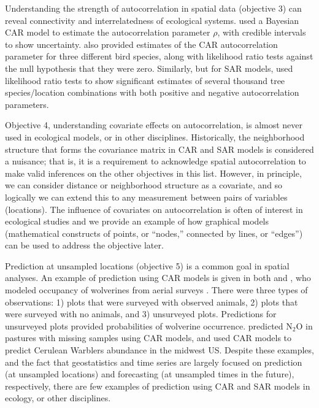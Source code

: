 Understanding the strength of autocorrelation in spatial data (objective 3) can reveal connectivity and interrelatedness of ecological systems.  \citet{Gard:Lawl:Ver:Mago:Kell:coar:2010} used a Bayesian CAR model to estimate the autocorrelation parameter $\rho$, with credible intervals to show uncertainty. \citet{Lich:Simo:Shri:Fran:spat:2002} also provided estimates of the CAR autocorrelation parameter for three different bird species, along with likelihood ratio tests against the null hypothesis that they were zero.  Similarly, but for SAR models, \citet{Bull:Burk:eval:2005} used likelihood ratio tests to show significant estimates of several thousand tree species/location combinations with both positive and negative autocorrelation parameters.

Objective 4, understanding covariate effects on autocorrelation, is almost never used in ecological models, or in other disciplines. Historically, the neighborhood structure that forms the covariance matrix in CAR and SAR models is considered a nuisance; that is, it is a requirement to acknowledge spatial autocorrelation to make valid inferences on the other objectives in this list. However, in principle, we can consider distance or neighborhood structure as a covariate, and so logically we can extend this to any measurement between pairs of variables (locations). The influence of covariates on autocorrelation is often of interest in ecological studies \citep{Hank:Hoot:circ:2013} and we provide an example of how graphical models (mathematical constructs of points, or ``nodes,'' connected by lines, or ``edges'') can be used to address the objective later. 

Prediction at unsampled locations (objective 5) is a common goal in spatial analyses.  An example of prediction using CAR models is given in both \citet{Mago:Ray:John:Valk:Daws:Bowm:mode:2007} and \citet{Gard:Lawl:Ver:Mago:Kell:coar:2010}, who modeled occupancy of wolverines from aerial surveys \citep[also see][]{John:Conn:Hoot:Ray:Pond:spat:2013}. There were three types of observations: 1) plots that were surveyed with observed animals, 2) plots that were surveyed with no animals, and 3) unsurveyed plots.  Predictions for unsurveyed plots provided probabilities of wolverine occurrence. \citet{Huan:Grac:Hu:Rowl:Meng:spat:2013} predicted N$_2$O in pastures with missing samples using CAR models, and \citet{Thog:Saue:Knut:hier:2004} used CAR models to predict Cerulean Warblers abundance in the midwest US. Despite these examples, and the fact that geostatistics and time series are largely focused on prediction (at unsampled locations) and forecasting (at unsampled times in the future), respectively, there are few examples of prediction using CAR and SAR models in ecology, or other disciplines.

